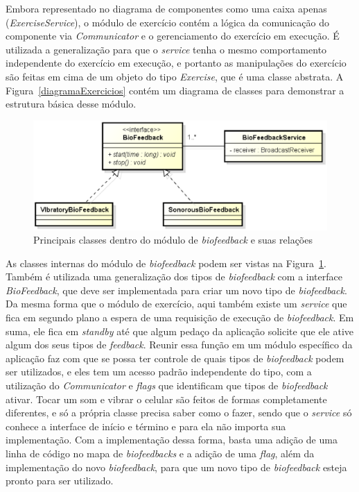 Embora representado no diagrama de componentes como uma caixa apenas (\textit{ExerciseService}), o módulo de exercício contém a lógica da comunicação do componente via \textit{Communicator} e o gerenciamento do exercício em execução. É utilizada a generalização para que o \textit{service} tenha o mesmo comportamento independente do exercício em execução, e portanto as manipulações do exercício são feitas em cima de um objeto do tipo \textit{Exercise}, que é uma classe abstrata. A Figura~\ref{diagramaExercicios} contém um diagrama de classes para demonstrar a estrutura básica desse módulo.

\begin{figure}[!htb]
\centering
\includegraphics [keepaspectratio=true,scale=0.60]{figuras/diagramaBioFeedback.eps}
\caption{Principais classes dentro do módulo de \textit{biofeedback} e suas relações}
\label{diagramaBioFeedback}
\end{figure}

As classes internas do módulo de \textit{biofeedback} podem ser vistas na Figura~\ref{diagramaBioFeedback}. Também é utilizada uma generalização dos tipos de \textit{biofeedback} com a interface \textit{BioFeedback}, que deve ser implementada para criar um novo tipo de \textit{biofeedback}. Da mesma forma que o módulo de exercício, aqui também existe um \textit{service} que fica em segundo plano a espera de uma requisição de execução de \textit{biofeedback}. Em suma, ele fica em \textit{standby} até que algum pedaço da aplicação solicite que ele ative algum dos seus tipos de \textit{feedback}. Reunir essa função em um módulo específico da aplicação faz com que se possa ter controle de quais tipos de \textit{biofeedback} podem ser utilizados, e eles tem um acesso padrão independente do tipo, com a utilização do \textit{Communicator} e \textit{flags} que identificam que tipos de \textit{biofeedback} ativar. Tocar um som e vibrar o celular são feitos de formas completamente diferentes, e só a própria classe precisa saber como o fazer, sendo que o \textit{service} só conhece a interface de início e término e para ela não importa sua implementação. Com a implementação dessa forma, basta uma adição de uma linha de código no mapa de \textit{biofeedbacks} e a adição de uma \textit{flag}, além da implementação do novo \textit{biofeedback}, para que um novo tipo de \textit{biofeedback} esteja pronto para ser utilizado.

